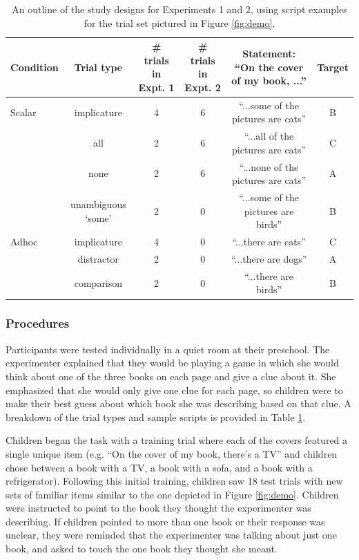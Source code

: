 \documentclass[10pt,letterpaper]{article}
\begin{document}
 \begin{table} [t]
   \caption{An outline of the study designs for Experiments 1 and 2, using script examples for the trial set pictured in Figure \ref{fig:demo}.  \label{tab:scripts} } 
   \begin{center} 
     \begin{tabular}{lccccc} 
                      \hline 
       \null   Condition  & Trial type & \# trials in Expt. 1 & \# trials in Expt. 2 & Statement: ``On the cover of my book, ...'' & Target   \\ 
       \hline  
            Scalar & implicature & 4 & 6 &  ``...some of the pictures are cats'' & B	 \\ 
          & all  & 2 &  6 & ``...all of the pictures are cats'' & C		                 \\
           & none  & 2 & 6 & ``...none of the pictures are cats'' & A			\\ 
               & unambiguous `some' 	&  2 & 0 & ``...some of the pictures are birds'' & B					        \\ 
	\hline
	    Adhoc       & implicature & 4 & 0 & ``...there are cats'' & C 		\\ 
	     & distractor & 2 & 0 & ``...there are dogs'' & A	     \\ 
          & comparison & 2 &  0 & ``...there are birds'' & B 	   \\
       \hline 

     \end{tabular} 
  \end{center}
 \end{table}
 

\subsubsection{Procedures}

Participants were tested individually in a quiet room at their preschool.  The experimenter explained that they would be playing a game in which she would think about one of the three books on each page and give a clue about it. She emphasized that she would only give one clue for each page, so children were to make their best guess about which book she was describing based on that clue. A breakdown of the trial types and sample scripts is provided in Table \ref{tab:scripts}.

Children began the task with a training trial where each of the covers featured a single unique item (e.g. ``On the cover of my book, there's a TV'' and children chose between a book with a TV, a book with a sofa, and a book with a refrigerator).  Following this initial training, children saw 18 test trials with new sets of familiar items similar to the one depicted in Figure \ref{fig:demo}.  Children were instructed to point to the book they thought the experimenter was describing. If children pointed to more than one book or their response was unclear, they were reminded that the experimenter was talking about just one book, and asked to touch the one book they thought she meant.  
\end{document}
